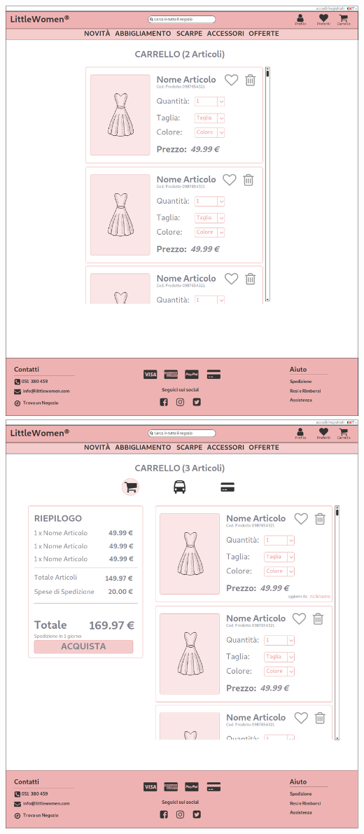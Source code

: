 \documentclass[12pt,a4paper]{report}
\begin{document}
\includegraphics[width=\textwidth]{"Project Management Sources/Wireframe/WireFrame Screenshot/Desktop/8 - Carrello Young"}
\includegraphics[width=\textwidth]{"Project Management Sources/Wireframe/WireFrame Screenshot/Desktop/9 - Carrello Genitore"}
\end{document}
